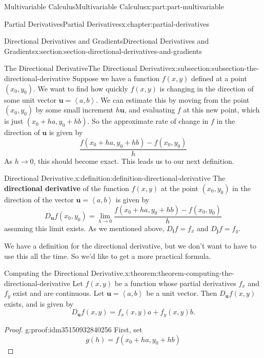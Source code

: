\documentclass[twoside,10pt,]{tufte-book}
\newcommand{\terminology}[1]{\textbf{#1}}
\numberwithin{equation}{part}
\newcommand{\vb}[1]{\mathbf{#1}}
\newcommand{\dotprod}[1]{\left\langle #1 \right\rangle}
\begin{document}
\begin{partptx}{Multivariable Calculus}{}{Multivariable Calculus}{}{}{x:part:part-multivariable}
\begin{chapterptx}{Partial Derivatives}{}{Partial Derivatives}{}{}{x:chapter:partial-derivatives}
\begin{sectionptx}{Directional Derivatives and Gradients}{}{Directional Derivatives and Gradients}{}{}{x:section:section-directional-derivatives-and-gradients}
%
\begin{subsectionptx}{The Directional Derivative}{}{The Directional Derivative}{}{}{x:subsection:subsection-the-directional-derivative}
Suppose we have a function \(f(x,y)\) defined at a point \((x_{0},y_{0})\). We want to find how quickly \(f(x,y)\) is changing in the direction of some unit vector \(\vb{u} = \dotprod{a,b}\). We can estimate this by moving from the point \((x_{0},y_{0})\) by some small increment \(h\vb{u}\), and evaluating \(f\) at this new point, which is just \((x_{0} + ha, y_{0} + hb)\). So the approximate rate of change in \(f\) in the direction of \(\vb{u}\) is given by%
\begin{equation*}
\frac{f(x_{0}+ha, y_{0} + hb) - f(x_{0},y_{0})}{h}
\end{equation*}
As \(h\to0\), this should become exact. This leads us to our next definition.%
\begin{definition}{Directional Derivative.}{x:definition:definition-directional-derivative}%
%
The \terminology{directional derivative} of the function \(f(x,y)\) at the point \((x_{0},y_{0})\) in the direction of the vector \(\vb{u} = \dotprod{a,b}\) is given by%
\begin{equation*}
D_{\vb{u}}f(x_{0},y_{0}) = \lim_{h\to0}\frac{f(x_{0}+ha, y_{0} + hb) - f(x_{0},y_{0})}{h}
\end{equation*}
assuming this limit exists. As we mentioned above, \(D_{\vb{i}}f = f_{x}\) and \(D_{\vb{j}}f = f_{y}\).%
\end{definition}
We have a definition for the directional derivative, but we don't want to have to use this all the time. So we'd like to get a more practical formula.%
\begin{theorem}{Computing the Directional Derivative.}{}{x:theorem:theorem-computing-the-directional-derivative}%
%
Let \(f(x,y)\) be a function whose partial derivatives \(f_{x}\) and \(f_{y}\) exist and are continuous. Let \(\vb{u} = \dotprod{a,b}\) be a unit vector. Then \(D_{\vb{u}}f(x,y)\) exists, and is given by%
\begin{equation*}
D_{\vb{u}}f(x,y) = f_{x}(x,y)a + f_{y}(x,y)b.
\end{equation*}
%
\end{theorem}
\begin{proof}{}{g:proof:idm35150932840256}
First, set%
\begin{equation*}
g(h) = f(x_{0}+ha, y_{0} +hb)
\end{equation*}

\end{proof}
\end{subsectionptx}
\end{sectionptx}
\end{chapterptx}
\end{partptx}
\end{document}
